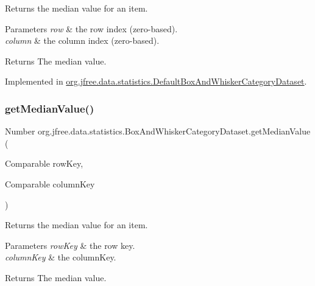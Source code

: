 Returns the median value for an item.


\begin{DoxyParams}{Parameters}
{\em row} & the row index (zero-\/based). \\
\hline
{\em column} & the column index (zero-\/based).\\
\hline
\end{DoxyParams}
\begin{DoxyReturn}{Returns}
The median value. 
\end{DoxyReturn}


Implemented in \mbox{\hyperlink{classorg_1_1jfree_1_1data_1_1statistics_1_1_default_box_and_whisker_category_dataset_a71fe367beb1408e129204aa19fa5502b}{org.\+jfree.\+data.\+statistics.\+Default\+Box\+And\+Whisker\+Category\+Dataset}}.

\mbox{\label{interfaceorg_1_1jfree_1_1data_1_1statistics_1_1_box_and_whisker_category_dataset_aaaf3632c9a3f6aeb0d0c66454a206be3}} 
\subsubsection{\texorpdfstring{get\+Median\+Value()}{getMedianValue()}\hspace{0.1cm}{\footnotesize\ttfamily [2/2]}}
{\footnotesize\ttfamily Number org.\+jfree.\+data.\+statistics.\+Box\+And\+Whisker\+Category\+Dataset.\+get\+Median\+Value (\begin{DoxyParamCaption}\item[{Comparable}]{row\+Key,  }\item[{Comparable}]{column\+Key }\end{DoxyParamCaption})}

Returns the median value for an item.


\begin{DoxyParams}{Parameters}
{\em row\+Key} & the row key. \\
\hline
{\em column\+Key} & the column\+Key.\\
\hline
\end{DoxyParams}
\begin{DoxyReturn}{Returns}
The median value. 
\end{DoxyReturn}


